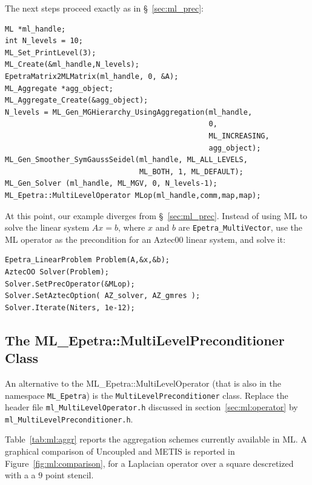 The next steps proceed exactly as in \S~\ref{sec:ml_prec}:
\begin{verbatim}
ML *ml_handle;
int N_levels = 10;
ML_Set_PrintLevel(3);
ML_Create(&ml_handle,N_levels);
EpetraMatrix2MLMatrix(ml_handle, 0, &A);
ML_Aggregate *agg_object;
ML_Aggregate_Create(&agg_object);
N_levels = ML_Gen_MGHierarchy_UsingAggregation(ml_handle, 
                                               0,
                                               ML_INCREASING,
                                               agg_object);
ML_Gen_Smoother_SymGaussSeidel(ml_handle, ML_ALL_LEVELS,
                               ML_BOTH, 1, ML_DEFAULT);
ML_Gen_Solver (ml_handle, ML_MGV, 0, N_levels-1);
ML_Epetra::MultiLevelOperator MLop(ml_handle,comm,map,map);
\end{verbatim}

At this point, our example diverges from \S~\ref{sec:ml_prec}.
Instead of using ML to solve the linear system $A x = b$,
where $x$ and $b$ are \verb!Epetra_MultiVector!,  use 
the ML operator as the precondition for an Aztec00 linear system,
and solve it:
\begin{verbatim}
Epetra_LinearProblem Problem(A,&x,&b);
AztecOO Solver(Problem);
Solver.SetPrecOperator(&MLop);
Solver.SetAztecOption( AZ_solver, AZ_gmres );
Solver.Iterate(Niters, 1e-12);
\end{verbatim}
\subsection{The ML\_Epetra::MultiLevelPreconditioner Class}
\label{sec:ml:preconditioner}
An alternative to the ML\_Epetra::MultiLevelOperator
(that is also in the namespace {\tt ML\_Epetra}) 
is the \verb!MultiLevelPreconditioner! class.  Replace the header file 
\newline \verb!ml_MultiLevelOperator.h!  discussed in section~\ref{sec:ml:operator} 
by \verb!ml_MultiLevelPreconditioner.h!.

Table~\ref{tab:ml:aggr} reports the aggregation schemes currently
available in ML. A graphical comparison of Uncoupled and METIS is
reported in Figure~\ref{fig:ml:comparison}, for a
Laplacian operator over a square descretized with a a $9$ point stencil.

